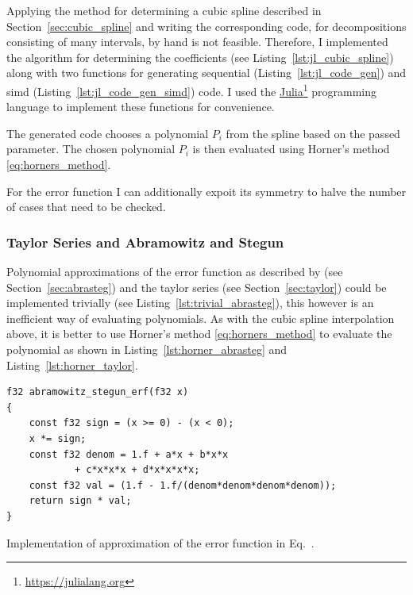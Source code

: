 \documentclass[a4paper, 11pt]{memoir}
\begin{document}
    Applying the method for determining a cubic spline described in Section~\ref{sec:cubic_spline} and writing the
    corresponding code, for decompositions consisting of many intervals, by hand is not feasible. Therefore, I implemented 
    the algorithm for determining the coefficients (see Listing~\ref{lst:jl_cubic_spline}) along with two functions for
    generating sequential (Listing~\ref{lst:jl_code_gen}) and \gls{simd} (Listing~\ref{lst:jl_code_gen_simd}) code. I used
    the \href{https://julialang.org}{Julia}\footnote{\href{https://julialang.org}{https://julialang.org}} programming
    language to implement these functions for convenience.
    
    The generated code chooses a polynomial $P_i$ from the spline based on the passed parameter. The chosen polynomial
    $P_i$ is then evaluated using Horner's method \eqref{eq:horners_method}.

    For the error function I can additionally expoit its symmetry to halve the number of cases that need to be checked.

    \subsubsection{Taylor Series and Abramowitz and Stegun}
    \label{sec:impl_abrasteg_taylor}
    Polynomial approximations of the error function as described by \citeauthor{AbraSteg72} (see
    Section~\ref{sec:abrasteg}) and the taylor series (see Section~\ref{sec:taylor}) could be implemented trivially (see
    Listing~\ref{lst:trivial_abrasteg}), this however is an inefficient way of evaluating polynomials. As with the cubic
    spline interpolation above, it is better to use Horner's method \eqref{eq:horners_method} to evaluate the polynomial
    as shown in Listing~\ref{lst:horner_abrasteg} and Listing~\ref{lst:horner_taylor}.

    \begin{listing}[t]
        \begin{verbatim}
f32 abramowitz_stegun_erf(f32 x)
{
    const f32 sign = (x >= 0) - (x < 0);
    x *= sign;
    const f32 denom = 1.f + a*x + b*x*x
            + c*x*x*x + d*x*x*x*x;
    const f32 val = (1.f - 1.f/(denom*denom*denom*denom));
    return sign * val;
}
        \end{verbatim}
        \caption{Implementation of approximation of the error function in Eq.~.}
        \label{lst:trivial_abrasteg}
    \end{listing}
\end{document}
